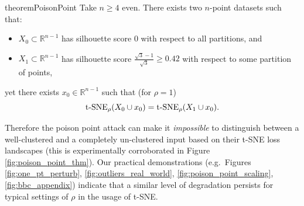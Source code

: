 \begin{restatable}{theorem}{PoisonPoint} 
\label{thm:poison_point}
Take \(n\geq 4\) even. There exists two \(n\)-point datasets such that:
\begin{itemize}
    \item \(X_0 \subset \mathbb{R}^{n-1}\) has silhouette score \(0\) with respect to all partitions, and
    \item \(X_1\subset \mathbb{R}^{n-1}\) has silhouette score \(\frac{\sqrt{3}-1}{\sqrt{3}}\geq 0.42\) with respect to some partition of points,
\end{itemize}
yet there exists \(x_0\in \mathbb{R}^{n-1}\) such that (for \(\rho = 1\))
$$
{\operatorname*{t-SNE}}_\rho(X_0\cup x_0)={\operatorname*{t-SNE}}_\rho(X_1\cup x_0).
$$
\end{restatable}

Therefore the poison point attack can make it \textit{impossible} to distinguish between a well-clustered and a completely un-clustered input based on their t-SNE loss landscapes (this is experimentally corroborated in Figure \ref{fig:poison_point_thm}). %
Our practical demonstrations (e.g.\ Figures \ref{fig:one_pt_perturb}, 
\ref{fig:outliers_real_world}, \ref{fig:poison_point_scaling},
\ref{fig:bbc_appendix}) indicate that a similar level of degradation persists for typical settings of \(\rho\) in the usage of t-SNE.










